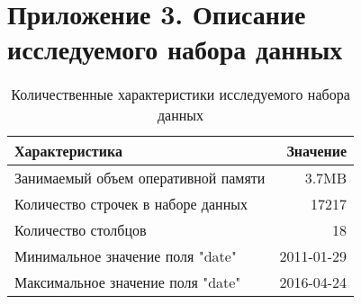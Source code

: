 ﻿
\chapter{Приложение 3. Описание исследуемого набора данных}


\begin{table}[h]
    \centering
    \begin{tabular}{|l|r|}
		\hline
			Характеристика	& Значение \\
		\hline
			Занимаемый объем оперативной памяти & 3.7MB      \\
			Количество строчек в наборе данных  & 17217      \\
            Количество столбцов                 & 18         \\
			Минимальное значение поля "date"    & 2011-01-29 \\
            Максимальное значение поля "date"   & 2016-04-24 \\
		\hline
	\end{tabular}
	\caption{ Количественные характеристики исследуемого набора данных }
	\label{tbl:sales_dataset_description_quantitive}
\end{table}


